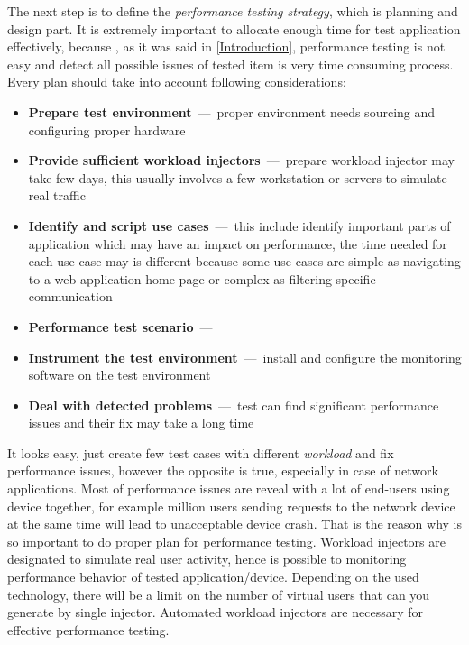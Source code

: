 The next step is to define the \emph{performance testing strategy}, which is planning and design part. It is extremely important to allocate enough time for test application effectively, because , as it was said in \ref{Introduction}, performance testing is not easy and detect all possible issues of tested item is very time consuming process. Every plan should take into account following considerations:

\begin{itemize}
	\setlength\itemsep{0em}
	\item \textbf{Prepare test environment} \,---\ proper environment needs sourcing and configuring proper hardware
	\item \textbf{Provide sufficient workload injectors} \,---\ prepare workload injector may take few days, this usually involves a few workstation or servers to simulate real traffic 
	\item \textbf{Identify and script use cases} \,---\ this include identify important parts of application which may have an impact on performance, the time needed for each use case may is different because some use cases are simple as navigating to a web application home page or complex as filtering specific communication
	\item \textbf{Performance test scenario} \,---\ 
	\item \textbf{Instrument the test environment} \,---\ install and configure the monitoring software on the test environment
	\item \textbf{Deal with detected problems} \,---\ test can find significant performance issues and their fix may take a long time
\end{itemize}

It looks easy, just create few test cases with different \emph{workload} and fix performance issues, however the opposite is true, especially in case of network applications. Most of performance issues are reveal with a lot of end-users using device together, for example million users sending requests to the network device at the same time will lead to unacceptable device crash. That is the reason why is so important to do proper plan for performance testing. Workload injectors are designated to simulate real user activity, hence is possible to monitoring performance behavior of tested application/device. Depending on the used technology, there will be a limit on the number of virtual users that can you generate by single injector. Automated workload injectors are necessary for effective performance testing.

